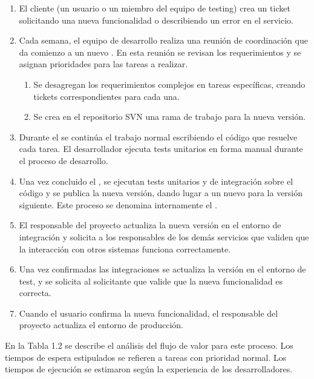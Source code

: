 \begin{enumerate}
\item El cliente (un usuario o un miembro del equipo de testing) crea
  un ticket solicitando una nueva funcionalidad o describiendo un
  error en el servicio.
\item Cada semana, el equipo de desarrollo realiza una reunión de
  coordinación que da comienzo a un nuevo . En esta
  reunión se revisan los requerimientos y se asignan prioridades para
  las tareas a realizar.
\begin{enumerate}
\item Se desagregan los requerimientos complejos en tareas
  específicas, creando tickets correspondientes para cada una.
\item Se crea en el repositorio SVN una rama de trabajo para la nueva
  versión.
\end{enumerate}
\item Durante el  se continúa el trabajo normal
  escribiendo el código que resuelve cada tarea. El desarrollador
  ejecuta tests unitarios en forma manual durante el proceso de
  desarrollo.
\item Una vez concluido el , se ejecutan tests
  unitarios y de integración sobre el código y se publica la nueva
  versión, dando lugar a un nuevo  para la versión
  siguiente. Este proceso se denomina internamente el .
\item El responsable del proyecto actualiza la nueva versión en el
  entorno de integración y solicita a los responsables de los demás
  servicios que validen que la interacción con otros sistemas funciona
  correctamente.
\item Una vez confirmadas las integraciones se actualiza la versión en
  el entorno de test, y se solicita al solicitante que valide que la
  nueva funcionalidad es correcta.
\item Cuando el usuario confirma la nueva funcionalidad, el
  responsable del proyecto actualiza el entorno de producción.
\end{enumerate}
En la Tabla 1.2 se describe el análisis del flujo de valor para este
proceso. Los tiempos de espera estipulados se refieren a tareas con
prioridad normal. Los tiempos de ejecución se estimaron según la
experiencia de los desarrolladores.

